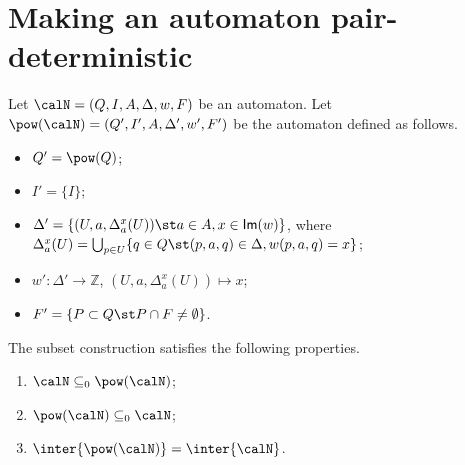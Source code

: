 \documentclass[a4paper]{article}
\begin{document}
\section{Making an automaton pair-deterministic}
Let $\calN =  (Q, I, A, \Delta, w, F)$ be an automaton.  Let
$\pow(\calN) =  (Q', I', A, \Delta', w', F')$ be the
automaton defined as follows.
\begin{itemize}[nolistsep]
	\item $Q' = \pow(Q)$;
	\item $I'= \{ I \} $;
	\item $\Delta' = \{ (U, a,\Delta_{a}^x(U)) \st a \in
		A, x \in \textsf{Im}(w) \}$, where $\Delta_{a}^x(U) =
		\bigcup_{p \in U}\{ q \in Q \st (p,a,q) \in \Delta,
		w(p,a,q) = x \}$;
	\item $w' : \Delta' \rightarrow \mathbb{Z}$, $(U, a,
		\Delta_{a}^x(U)) \mapsto x$;
	\item $F' = \{ P \subset Q \st P \cap F \neq \emptyset \}$.
\end{itemize}

\begin{lemma}\label{lem:subset-construction}
	The subset construction satisfies the following properties.
	\begin{enumerate}[nolistsep]
		\item\label{lem-item:sub_sub} $\calN \subseteq_0 \pow(\calN)$;
		\item\label{lem-item:sub_sup} $\pow(\calN) \subseteq_0 \calN$;
		\item\label{lem-item:sub_equ} $\inter{\pow(\calN)} =
			\inter{\calN}$.
	\end{enumerate}
\end{lemma}
\end{document}
